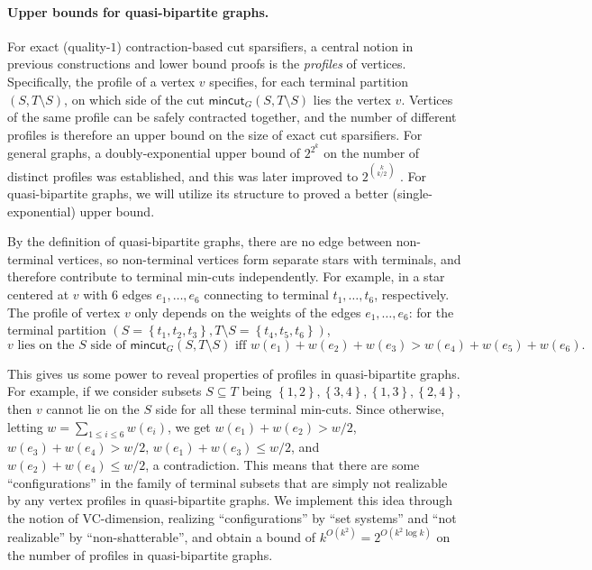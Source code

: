 \documentclass[11pt]{article}
\theoremstyle{definition}
\newcommand{\set}[1]{\left\{ #1 \right\}}
\newcommand{\mc}{\mathsf{mincut}}
\begin{document}
\paragraph{Upper bounds for quasi-bipartite graphs.}
For exact (quality-$1$) contraction-based cut sparsifiers, a central notion in previous constructions and lower bound proofs is the \emph{profiles} of vertices. Specifically, the profile of a vertex $v$ specifies, for each terminal partition $(S,T\setminus S)$, on which side of the cut $\mc_G(S,T\setminus S)$ lies the vertex $v$.
Vertices of the same profile can be safely contracted together, and the number of different profiles is therefore an upper bound on the size of exact cut sparsifiers. For general graphs, a doubly-exponential upper bound of $2^{2^k}$ \cite{hagerup1998characterizing} on the number of distinct profiles was established, and this was later improved to $2^{\binom{k}{k/2}}$ \cite{khan2014mimicking}. For quasi-bipartite graphs, we will utilize its structure to proved a better (single-exponential) upper bound.

By the definition of quasi-bipartite graphs, there are no edge between non-terminal vertices, so non-terminal vertices form separate stars with terminals, and therefore contribute to terminal min-cuts independently. For example, in a star centered at $v$ with $6$ edges $e_1,\ldots,e_6$ connecting to terminal $t_1,\ldots,t_6$, respectively. The profile of vertex $v$ only depends on the weights of the edges $e_1,\ldots,e_6$: for the terminal partition $(S=\set{t_1,t_2,t_3},T\setminus S=\set{t_4,t_5,t_6})$, $$\text{$v$ lies on the $S$ side of $\mc_G(S,T\setminus S)$ iff } w(e_1)+w(e_2)+w(e_3)>w(e_4)+w(e_5)+w(e_6).$$

This gives us some power to reveal properties of profiles in quasi-bipartite graphs.
For example, if we consider subsets $S\subseteq T$ being $\set{1,2},\set{3,4},\set{1,3},\set{2,4}$, then $v$ cannot lie on the $S$ side for all these terminal min-cuts. Since otherwise, letting $w=\sum_{1\le  i\le 6}w(e_i)$, we get $w(e_1)+w(e_2)>w/2$, $w(e_3)+w(e_4)>w/2$, $w(e_1)+w(e_3)\le w/2$, and $w(e_2)+w(e_4)\le w/2$, a contradiction. This means that there are some ``configurations'' in the family of terminal subsets that are simply not realizable by any vertex profiles in quasi-bipartite graphs. We implement this idea through the notion of VC-dimension, realizing ``configurations'' by ``set systems'' and ``not realizable'' by ``non-shatterable'', and obtain a bound of $k^{O(k^2)}=2^{O(k^2\log k)}$ on the number of  profiles in quasi-bipartite graphs.
\end{document}
